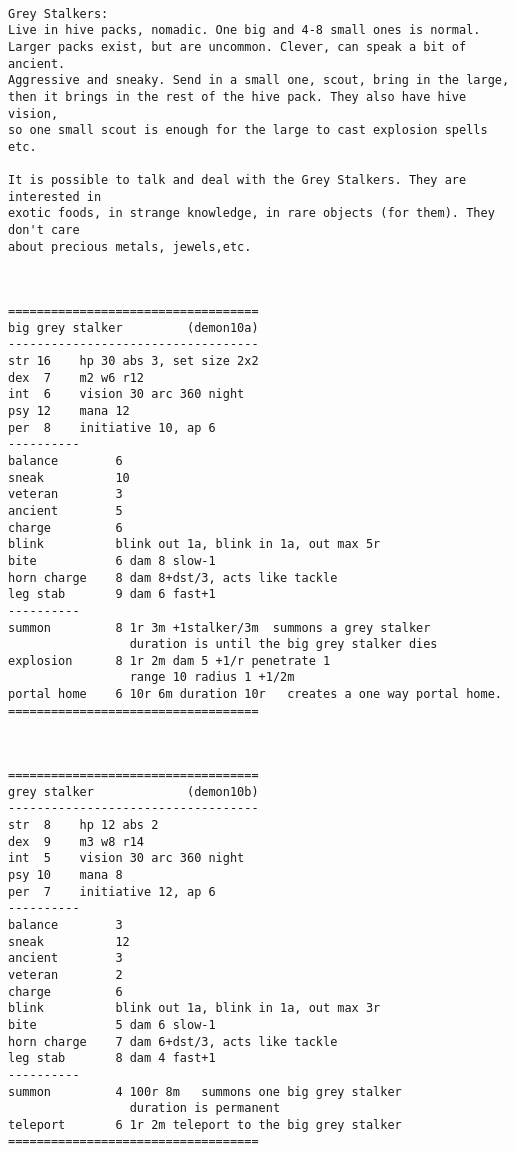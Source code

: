 \

\goodbreak \begin{samepage} \small \begin{verbatim}
Grey Stalkers:
Live in hive packs, nomadic. One big and 4-8 small ones is normal.
Larger packs exist, but are uncommon. Clever, can speak a bit of ancient.
Aggressive and sneaky. Send in a small one, scout, bring in the large,
then it brings in the rest of the hive pack. They also have hive vision,
so one small scout is enough for the large to cast explosion spells etc.

It is possible to talk and deal with the Grey Stalkers. They are interested in
exotic foods, in strange knowledge, in rare objects (for them). They don't care
about precious metals, jewels,etc.
\end{verbatim} \normalsize \end{samepage}

\

\goodbreak \begin{samepage} \small \begin{verbatim}
===================================
big grey stalker         (demon10a)
-----------------------------------
str 16    hp 30 abs 3, set size 2x2
dex  7    m2 w6 r12
int  6    vision 30 arc 360 night
psy 12    mana 12
per  8    initiative 10, ap 6
----------
balance        6
sneak          10
veteran        3
ancient        5
charge         6
blink          blink out 1a, blink in 1a, out max 5r
bite           6 dam 8 slow-1
horn charge    8 dam 8+dst/3, acts like tackle
leg stab       9 dam 6 fast+1
----------
summon         8 1r 3m +1stalker/3m  summons a grey stalker
                 duration is until the big grey stalker dies
explosion      8 1r 2m dam 5 +1/r penetrate 1
                 range 10 radius 1 +1/2m
portal home    6 10r 6m duration 10r   creates a one way portal home.
===================================
\end{verbatim} \normalsize \end{samepage}

\

\goodbreak \begin{samepage} \small \begin{verbatim}
===================================
grey stalker             (demon10b)
-----------------------------------
str  8    hp 12 abs 2
dex  9    m3 w8 r14
int  5    vision 30 arc 360 night
psy 10    mana 8
per  7    initiative 12, ap 6
----------
balance        3
sneak          12
ancient        3
veteran        2
charge         6
blink          blink out 1a, blink in 1a, out max 3r
bite           5 dam 6 slow-1
horn charge    7 dam 6+dst/3, acts like tackle
leg stab       8 dam 4 fast+1
----------
summon         4 100r 8m   summons one big grey stalker
                 duration is permanent
teleport       6 1r 2m teleport to the big grey stalker
===================================
\end{verbatim} \normalsize \end{samepage}








